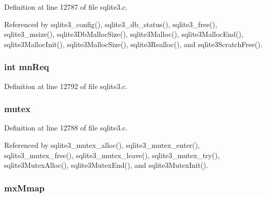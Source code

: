 Definition at line 12787 of file sqlite3.\+c.



Referenced by sqlite3\+\_\+config(), sqlite3\+\_\+db\+\_\+status(), sqlite3\+\_\+free(), sqlite3\+\_\+msize(), sqlite3\+Db\+Malloc\+Size(), sqlite3\+Malloc(), sqlite3\+Malloc\+End(), sqlite3\+Malloc\+Init(), sqlite3\+Malloc\+Size(), sqlite3\+Realloc(), and sqlite3\+Scratch\+Free().

\hypertarget{struct_sqlite3_config_a2dfb8267a9ac25087c2b53d6f3ed937d}{}
\subsubsection[{mn\+Req}]{\setlength{\rightskip}{0pt plus 5cm}int mn\+Req}\label{struct_sqlite3_config_a2dfb8267a9ac25087c2b53d6f3ed937d}


Definition at line 12792 of file sqlite3.\+c.

\hypertarget{struct_sqlite3_config_a7139046a63b0fa38ee9d2dfa0ced3019}{}
\subsubsection[{mutex}]{ mutex}\label{struct_sqlite3_config_a7139046a63b0fa38ee9d2dfa0ced3019}


Definition at line 12788 of file sqlite3.\+c.



Referenced by sqlite3\+\_\+mutex\+\_\+alloc(), sqlite3\+\_\+mutex\+\_\+enter(), sqlite3\+\_\+mutex\+\_\+free(), sqlite3\+\_\+mutex\+\_\+leave(), sqlite3\+\_\+mutex\+\_\+try(), sqlite3\+Mutex\+Alloc(), sqlite3\+Mutex\+End(), and sqlite3\+Mutex\+Init().

\hypertarget{struct_sqlite3_config_ad96e6aa2ef236c16df4ff57b6c11b2f1}{}
\subsubsection[{mx\+Mmap}]{ mx\+Mmap}\label{struct_sqlite3_config_ad96e6aa2ef236c16df4ff57b6c11b2f1}


